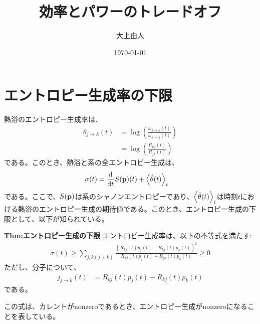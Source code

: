 \documentclass[a4paper,11pt]{jsarticle}
\numberwithin{equation}{section}
\begin{document}
\title{効率とパワーのトレードオフ}
\author{大上由人}
\date{\today}
\maketitle

\section{エントロピー生成率の下限}
熱浴のエントロピー生成率は、
\begin{align}
  \theta_{j \to k}(t) &= \log(\frac{\omega_{j \to k}(t)}{\omega_{k \to j}(t)})\\
  &= \log(\frac{R_{kj}(t)}{R_{jk}(t)})
\end{align}
である。このとき、熱浴と系の全エントロピー生成は、
\begin{align}
  \sigma(t) &= \dv{t}S(\vb{p})(t) + \ev{\hat{\theta}(t)}_t 
\end{align}
である。ここで、$S(\vb{p})$は系のシャノンエントロピーであり、$\ev{\hat{\theta}(t)}_t$は時刻$t$における熱浴のエントロピー生成の期待値である。このとき、エントロピー生成の下限として、以下が知られている。
\begin{itembox}[l]{\textbf{Thm:エントロピー生成の下限}}
    エントロピー生成率は、以下の不等式を満たす:
    \begin{align}
      \sigma(t) \geq \sum_{j,k(j \neq k)}\frac{(R_{kj}(t)p_j(t)-R_{kj}(t)p_k(t))^2}{R_{kj}(t)p_j(t)+R_{jk}(t)p_k(t)} \geq 0
    \end{align}
    ただし、分子について、
    \begin{align}
      j_{j\to k}(t) &= R_{kj}(t)p_j(t)-R_{kj}(t)p_k(t)
    \end{align}
    である。
\end{itembox}
この式は、カレントがnonzeroであるとき、エントロピー生成がnonzeroになることを表している。
\end{document}
